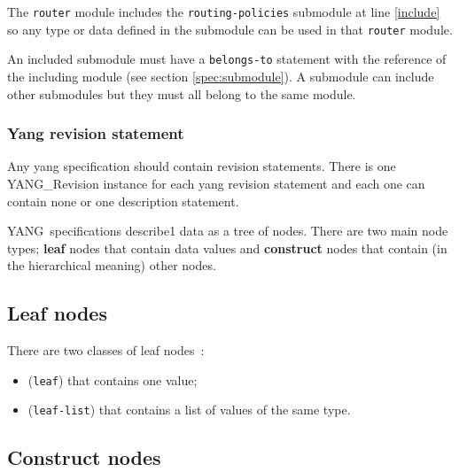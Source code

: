 \documentclass[a4paper]{article}
\newcommand{\y}{YANG}
\begin{document}
The {\tt router} module  includes the {\tt routing-policies} submodule
at line \ref{include} so any type or data defined in the submodule can
be used in that {\tt router} module.

An included submodule must have  a {\tt belongs-to} statement with the
reference of the  including module (see section \ref{spec:submodule}).
A submodule can  include other submodules but they  must all belong to
the same module.



\subsubsection{Yang revision statement}

Any yang specification should  contain revision statements.  There is
one YANG\_Re\-vi\-si\-on  instance for each yang  revision statement and
each one can contain none or one description statement.




\y\ specifications  describe1 data as a  tree of nodes.  There are two
main node  types; {\bf leaf} nodes  that contain data  values and {\bf
construct}  nodes that  contain  (in the  hierarchical meaning)  other
nodes.

\subsection{Leaf nodes}

There are two classes of leaf nodes~:
\begin{itemize}
\item
({\tt leaf}) that contains one value;
\item
({\tt leaf-list}) that contains a list of values of the same
type.
\end{itemize}

\subsection{Construct nodes}
\end{document}
